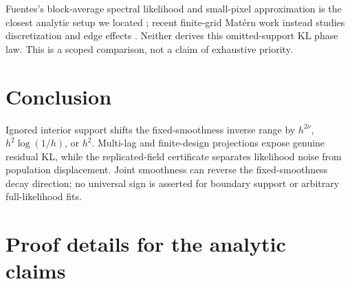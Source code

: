 \documentclass[sigconf]{acmart}
\theoremstyle{remark}
\begin{document}
Fuentes's block-average spectral likelihood and small-pixel approximation is
the closest analytic setup we located \cite{fuentes2007approximate}; recent
finite-grid Matérn work instead studies discretization and edge effects
\cite{simons2026finite}. Neither derives this omitted-support KL phase law.
This is a scoped comparison, not a claim of exhaustive priority.

\section{Conclusion}

Ignored interior support shifts the fixed-smoothness inverse range by
\(h^{2\nu}\), \(h^2\log(1/h)\), or \(h^2\). Multi-lag and finite-design
projections expose genuine residual KL, while the replicated-field certificate
separates likelihood noise from population displacement. Joint smoothness can
reverse the fixed-smoothness decay direction; no universal sign is asserted for
boundary support or arbitrary full-likelihood fits.

\clearpage



\clearpage
\appendix
\section{Proof details for the analytic claims}
\label{app:analytic-proof}
\end{document}
